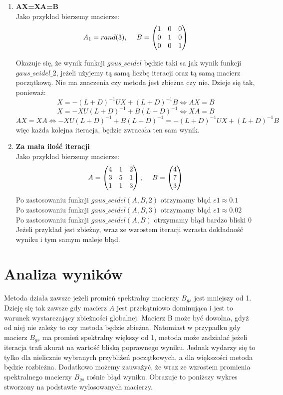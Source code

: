 \documentclass[12pt]{article}
\begin{document}
\begin{enumerate}
    \item \textbf{AX=XA=B}\\
    Jako przykład bierzemy macierze:
    \[
    A_1=rand(3),\hskip3ex
    B=\begin{pmatrix}
1 & 0 & 0 \\
0 & 1 & 0 \\
0 & 0 & 1 \\
\end{pmatrix}
    \]

    Okazuje się, że wynik funkcji $gaus\_seidel$ będzie taki sa jak wynik funkcji $gaus\_seidel\_2$, jeżeli użyjemy tą samą liczbę iteracji oraz tą samą macierz początkową. Nie ma znaczenia czy metoda jest zbieżna czy nie. Dzieje się tak, ponieważ:
    \[
    X=-(L+D)^{-1}UX+(L+D)^{-1}B \iff AX=B
    \]
\[
X=-XU(L+D)^{-1}+B(L+D)^{-1} \iff XA=B
\]
\[
AX=XA \iff -XU(L+D)^{-1}+B(L+D)^{-1}=-(L+D)^{-1}UX+(L+D)^{-1}B
\]
    więc każda kolejna iteracja, będzie zwracała ten sam wynik.

    \item \textbf{Za mała ilość iteracji}\\
    Jako przykład bierzemy macierze:
    \[
    A=\begin{pmatrix}
4 & 1 & 2 \\
3 & 5 & 1 \\
1 & 1 & 3 \\
\end{pmatrix},\hskip3ex
    B=\begin{pmatrix}
4 \\
7 \\
3 \\
\end{pmatrix}
    \]
Po zastosowaniu funkcji $gaus\_seidel(A,B,2)$ otrzymamy błąd $e1\approx0.1$\\
Po zastosowaniu funkcji $gaus\_seidel(A,B,3)$ otrzymamy błąd $e1\approx0.02$\\
Po zastosowaniu funkcji $gaus\_seidel(A,B)$ otrzymamy błąd bardzo bliski 0\\

Jeżeli przykład jest zbieżny, wraz ze wzrostem iteracji wzrasta dokładność  wyniku i tym samym maleje błąd.
\end{enumerate}

\section{Analiza wyników}

Metoda działa zawsze jeżeli promień spektralny macierzy $B_{gs}$ jest mniejszy od 1. Dzieję się tak zawsze gdy macierz $A$ jest przekątniowo dominująca i jest to warunek wystarczający zbieżności globalnej. Macierz B może być dowolna, gdyż od niej nie zależy to czy metoda będzie zbieżna. Natomiast w przypadku gdy macierz  $B_{gs}$ ma promień spektralny większy od 1, metoda może zadziałać jeżeli iteracja trafi akurat na wartość bliską poprawnego wyniku. Jednak wydarzy się to tylko dla nielicznie wybranych przybliżeń początkowych, a dla większości metoda będzie rozbieżna. Dodatkowo możemy zauważyć, że wraz ze wzrostem promienia spektralnego macierzy $B_{gs}$ rośnie błąd wyniku. Obrazuje to poniższy wykres stworzony na podstawie wylosowanych macierzy.
\end{document}
